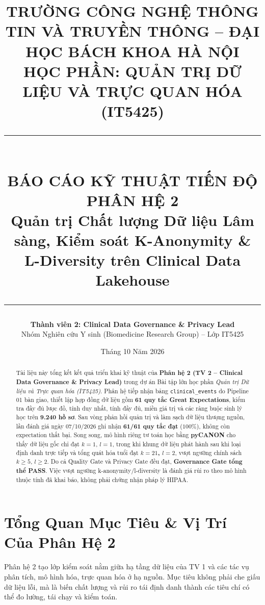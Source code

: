 \documentclass[11pt,a4paper]{article}
\title{%
  \vspace{-1.5cm}
  {\Large\bfseries TRƯỜNG CÔNG NGHỆ THÔNG TIN VÀ TRUYỀN THÔNG -- ĐẠI HỌC BÁCH KHOA HÀ NỘI}\\[0.3cm]
  {\large HỌC PHẦN: QUẢN TRỊ DỮ LIỆU VÀ TRỰC QUAN HÓA (IT5425)}\\[0.6cm]
  \rule{\textwidth}{1.5pt}\\[0.3cm]
  {\LARGE\bfseries BÁO CÁO KỸ THUẬT TIẾN ĐỘ PHÂN HỆ 2}\\[0.2cm]
  {\large\color{biomedblue}\textbf{Quản trị Chất lượng Dữ liệu Lâm sàng, Kiểm soát K-Anonymity \& L-Diversity trên Clinical Data Lakehouse}}\\[0.2cm]
  \rule{\textwidth}{0.8pt}
}
\author{%
  \textbf{Thành viên 2: Clinical Data Governance \& Privacy Lead}\\[0.1cm]
  Nhóm Nghiên cứu Y sinh (Biomedicine Research Group) -- Lớp IT5425
}
\date{Tháng 10 Năm 2026}
\begin{document}
\maketitle
\thispagestyle{fancy}

\begin{abstract}
Tài liệu này tổng kết kết quả triển khai kỹ thuật của \textbf{Phân hệ 2 (TV 2 -- Clinical Data Governance \& Privacy Lead)} trong dự án Bài tập lớn học phần \textit{Quản trị Dữ liệu và Trực quan hóa (IT5425)}. Phân hệ tiếp nhận bảng \texttt{clinical\_events} do Pipeline 01 bàn giao, thiết lập hợp đồng dữ liệu gồm \textbf{61 quy tắc Great Expectations}, kiểm tra đầy đủ lược đồ, tính duy nhất, tính đầy đủ, miền giá trị và các ràng buộc sinh lý học trên \textbf{9.240 hồ sơ}. Sau vòng phản hồi quản trị và làm sạch dữ liệu thượng nguồn, lần đánh giá ngày 07/10/2026 ghi nhận \textbf{61/61 quy tắc đạt} ($100\%$), không còn expectation thất bại. Song song, mô hình riêng tư toán học bằng \textbf{pyCANON} cho thấy dữ liệu gốc chỉ đạt $k=1$, $l=1$, trong khi khung dữ liệu phát hành sau khi loại định danh trực tiếp và tổng quát hóa tuổi đạt \textbf{$k=21$, $l=2$}, vượt ngưỡng chính sách $k\geq5$, $l\geq2$. Do cả Quality Gate và Privacy Gate đều đạt, \textbf{Governance Gate tổng thể PASS}. Việc vượt ngưỡng k-anonymity/l-diversity là đánh giá rủi ro theo mô hình thuộc tính đã khai báo, không phải chứng nhận pháp lý HIPAA.
\end{abstract}

\vspace{0.3cm}
\tableofcontents
\vspace{0.5cm}

\section{Tổng Quan Mục Tiêu \& Vị Trí Của Phân Hệ 2}

Phân hệ 2 tạo lớp kiểm soát nằm giữa hạ tầng dữ liệu của TV 1 và các tác vụ phân tích, mô hình hóa, trực quan hóa ở hạ nguồn. Mục tiêu không phải che giấu dữ liệu lỗi, mà là biến chất lượng và rủi ro tái định danh thành các tiêu chí có thể đo lường, tái chạy và kiểm toán.
\end{document}

